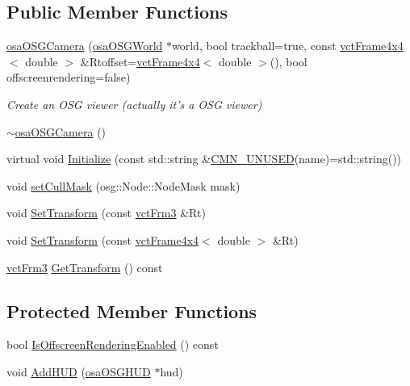 \subsection*{Public Member Functions}
\begin{DoxyCompactItemize}
\item 
\hyperlink{classosa_o_s_g_camera_a2c2bff6cb9c4e65b4291cb54ad7f85a1}{osa\-O\-S\-G\-Camera} (\hyperlink{classosa_o_s_g_world}{osa\-O\-S\-G\-World} $\ast$world, bool trackball=true, const \hyperlink{classvct_frame4x4}{vct\-Frame4x4}$<$ double $>$ \&Rtoffset=\hyperlink{classvct_frame4x4}{vct\-Frame4x4}$<$ double $>$(), bool offscreenrendering=false)
\begin{DoxyCompactList}\small\item\em Create an O\-S\-G viewer (actually it's a O\-S\-G viewer) \end{DoxyCompactList}\item 
\hyperlink{classosa_o_s_g_camera_a3e1e1489f4542ffd6f74e8c049668e10}{$\sim$osa\-O\-S\-G\-Camera} ()
\item 
virtual void \hyperlink{classosa_o_s_g_camera_a463a7fe829eef9a648d39b7cb8528bbd}{Initialize} (const std\-::string \&\hyperlink{cmn_portability_8h_a021894e2626935fa2305434b1e893ff6}{C\-M\-N\-\_\-\-U\-N\-U\-S\-E\-D}(name)=std\-::string())
\item 
void \hyperlink{classosa_o_s_g_camera_aef6949d5723708087d55450737507e0b}{set\-Cull\-Mask} (osg\-::\-Node\-::\-Node\-Mask mask)
\item 
void \hyperlink{classosa_o_s_g_camera_afd8497bb3272317953841dd6a4b36705}{Set\-Transform} (const \hyperlink{vct_transformation_types_8h_a81feda0a02c2d1bc26e5553f409fed20}{vct\-Frm3} \&Rt)
\item 
void \hyperlink{classosa_o_s_g_camera_ad0c30c16eab718188ad723b8863b6936}{Set\-Transform} (const \hyperlink{classvct_frame4x4}{vct\-Frame4x4}$<$ double $>$ \&Rt)
\item 
\hyperlink{vct_transformation_types_8h_a81feda0a02c2d1bc26e5553f409fed20}{vct\-Frm3} \hyperlink{classosa_o_s_g_camera_a63936900bd08ace45f6147563c9ee358}{Get\-Transform} () const 
\end{DoxyCompactItemize}
\subsection*{Protected Member Functions}
\begin{DoxyCompactItemize}
\item 
bool \hyperlink{classosa_o_s_g_camera_a99b8301f0cc63f54d4d66a74918cace2}{Is\-Offscreen\-Rendering\-Enabled} () const 
\item 
void \hyperlink{classosa_o_s_g_camera_ab83b41f25ac6a65018b5adbfa6bd6f0b}{Add\-H\-U\-D} (\hyperlink{classosa_o_s_g_h_u_d}{osa\-O\-S\-G\-H\-U\-D} $\ast$hud)
\end{DoxyCompactItemize}
